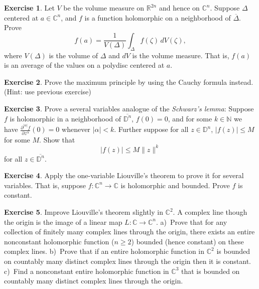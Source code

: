 \documentclass[12pt,openany]{book}
\newcommand{\sabs}[1]{\lvert {#1} \rvert}
\newcommand{\snorm}[1]{\lVert {#1} \rVert}
\newcommand{\C}{{\mathbb{C}}}
\newcommand{\R}{{\mathbb{R}}}
\newcommand{\N}{{\mathbb{N}}}
\newcommand{\D}{{\mathbb{D}}}
\newcommand{\myindex}[1]{#1\index{#1}}
\theoremstyle{plain}
\theoremstyle{remark}
\theoremstyle{definition}
\newenvironment{exbox}{%
    \def\FrameCommand{\vrule width 1pt \relax\hspace {10pt}}%
    \MakeFramed {\advance \hsize -\width \FrameRestore }%
}{%
    \endMakeFramed
}
\theoremstyle{exercise}
\newtheorem{exercise}{Exercise}[section]
\theoremstyle{example}
\begin{document}
\begin{exbox}
\begin{exercise} \label{exercise:averageDelta}
Let $V$ be the volume measure on $\R^{2n}$ and hence on $\C^n$.
Suppose $\Delta$ centered at $a \in \C^n$, and $f$ is a function holomorphic on
a neighborhood of $\overline{\Delta}$.  Prove
\begin{equation*}
f(a) =
\frac{1}{V(\Delta)}
\int_{\Delta} f(\zeta) \, dV(\zeta) ,
\end{equation*}
where $V(\Delta)$ is the volume of $\Delta$ and $dV$ is the volume measure.
That is, $f(a)$ is an average of the values on a polydisc centered at $a$.
\end{exercise}

\begin{exercise}
Prove the maximum principle by using the Cauchy formula instead.  (Hint:
use previous exercise)
\end{exercise}

\begin{exercise}
Prove a several variables analogue of the \emph{\myindex{Schwarz's lemma}}:
Suppose $f$ is holomorphic in a neighborhood of $\overline{\D^n}$,
$f(0) = 0$, and for some $k \in \N$ we have
$\frac{\partial^{\sabs{\alpha}} f}{\partial z^\alpha} (0) =
0$ whenever $\sabs{\alpha} < k$.  Further suppose 
for all $z \in \D^n$,
$\sabs{f(z)} \leq M$ for some $M$.  Show that
\begin{equation*}
\sabs{f(z)} \leq M \snorm{z}^k
\end{equation*}
for all $z \in \overline{\D^n}$.
\end{exercise}

\begin{exercise}
Apply the one-variable Liouville's theorem to prove it for several variables.
That is, suppose $f \colon \C^n \to \C$ is holomorphic and bounded.
Prove $f$ is constant.
\end{exercise}

\begin{exercise}
Improve Liouville's theorem slightly in $\C^2$.
A complex line though the origin is
the image of a linear map $L \colon \C \to \C^n$.  a)~Prove that 
for any collection of finitely many complex lines through the origin,
there exists an entire nonconstant holomorphic function ($n \geq 2$)
bounded (hence constant) on these complex lines.
b)~Prove that if an entire holomorphic function in $\C^2$ is bounded on
countably many distinct
complex lines through the origin then it is constant.
c)~Find a nonconstant entire holomorphic function in $\C^3$ that is
bounded on
countably many distinct
complex lines through the origin.
\end{exercise}


\end{exbox}
\end{document}
